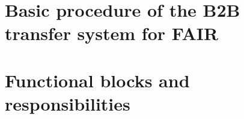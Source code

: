 \section{Basic procedure of the B2B transfer system for FAIR}
\section{Functional blocks and responsibilities}



